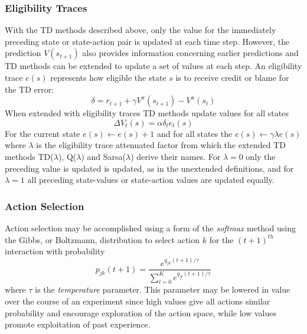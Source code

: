 \subsubsection{Eligibility Traces}
With the TD methods described above, only the value for the immediately
preceding state or state-action pair is updated at each time step.  However,
the prediction $V(s_{t+1})$ also provides information concerning earlier
predictions and TD methods can be extended to update a set of values at each step.  An eligibility trace $e(s)$ represents how eligible the state $s$ is to receive
credit or blame for the TD error:
\begin{equation}
\delta = r_{t+1} + \gamma V^\pi(s_{t+1}) - V^\pi(s_t)
\end{equation}
When extended with eligibility traces TD methods update values for all states
\begin{equation}
\Delta V_t(s) = \alpha \delta_t e_t(s)
\end{equation}
For the current state $e(s) \leftarrow e(s) + 1$ and for all states the
$e(s) \leftarrow \gamma \lambda e(s)$ where $\lambda$ is the eligibility trace
attenuated factor from which the extended TD methods TD($\lambda$),
Q($\lambda$) and Sarsa($\lambda$) derive their names. For $\lambda = 0$ only
the preceding value is updated is updated, as in the unextended definitions,
and for $\lambda = 1$ all preceding state-values or state-action values are
updated equally.

\subsubsection{Action Selection}
Action selection may be accomplished using a form of the \textit{softmax}
method \cite{suttonbarto:1998} using the Gibbs, or Boltzmann, distribution to select
action $k$ for the $(t+1)^{th}$ interaction with probability
\begin{equation}
p_{jk}(t+1) = \frac{e^{q_{jk}(t+1)/\tau}}{\sum_{l=0}^K e^{q_{jl}(t+1)/\tau}}
\end{equation}
where $\tau$ is the \textit{temperature} parameter.  This parameter may be
lowered in value over the course of an experiment since high values give all
actions similar probability and encourage exploration of the action space,
while low values promote exploitation of past experience.

